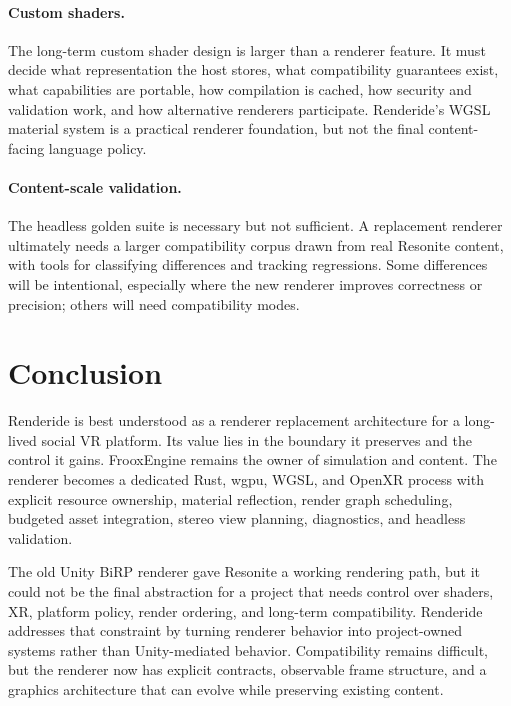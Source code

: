 \documentclass[acmtog,screen,nonacm]{acmart}
\begin{document}
\paragraph{Custom shaders.}
The long-term custom shader design is larger than a renderer feature. It must decide what representation the host stores, what compatibility guarantees exist, what capabilities are portable, how compilation is cached, how security and validation work, and how alternative renderers participate. Renderide's WGSL material system is a practical renderer foundation, but not the final content-facing language policy.

\paragraph{Content-scale validation.}
The headless golden suite is necessary but not sufficient. A replacement renderer ultimately needs a larger compatibility corpus drawn from real Resonite content, with tools for classifying differences and tracking regressions. Some differences will be intentional, especially where the new renderer improves correctness or precision; others will need compatibility modes.

\section{Conclusion}

Renderide is best understood as a renderer replacement architecture for a long-lived social VR platform. Its value lies in the boundary it preserves and the control it gains. FrooxEngine remains the owner of simulation and content. The renderer becomes a dedicated Rust, wgpu, WGSL, and OpenXR process with explicit resource ownership, material reflection, render graph scheduling, budgeted asset integration, stereo view planning, diagnostics, and headless validation.

The old Unity BiRP renderer gave Resonite a working rendering path, but it could not be the final abstraction for a project that needs control over shaders, XR, platform policy, render ordering, and long-term compatibility. Renderide addresses that constraint by turning renderer behavior into project-owned systems rather than Unity-mediated behavior. Compatibility remains difficult, but the renderer now has explicit contracts, observable frame structure, and a graphics architecture that can evolve while preserving existing content.



\end{document}
